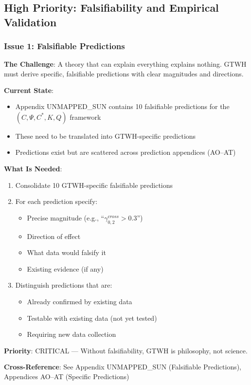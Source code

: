 \subsection{High Priority: Falsifiability and Empirical Validation}

\subsubsection{Issue 1: Falsifiable Predictions}

\begin{tcolorbox}[colback=red!5!white, colframe=red!75!black, title=Status: Partially Addressed]
\textbf{The Challenge}: A theory that can explain everything explains nothing. 
GTWH must derive specific, falsifiable predictions with clear magnitudes and 
directions.

\textbf{Current State}: 
\begin{itemize}[nosep]
\item Appendix UNMAPPED_SUN contains 10 falsifiable predictions for the $(C, \Psi, C^*, K, Q)$ framework
\item These need to be translated into GTWH-specific predictions
\item Predictions exist but are scattered across prediction appendices (AO--AT)
\end{itemize}

\textbf{What Is Needed}:
\begin{enumerate}
\item Consolidate 10 GTWH-specific falsifiable predictions
\item For each prediction specify:
    \begin{itemize}[nosep]
    \item Precise magnitude (e.g., ``$\gamma^{cross}_{0,2} > 0.3$'')
    \item Direction of effect
    \item What data would falsify it
    \item Existing evidence (if any)
    \end{itemize}
\item Distinguish predictions that are:
    \begin{itemize}[nosep]
    \item Already confirmed by existing data
    \item Testable with existing data (not yet tested)
    \item Requiring new data collection
    \end{itemize}
\end{enumerate}

\textbf{Priority}: \colorbox{red!20}{CRITICAL} --- Without falsifiability, GTWH is philosophy, not science.

\textbf{Cross-Reference}: See Appendix UNMAPPED_SUN (Falsifiable Predictions), Appendices AO--AT (Specific Predictions)
\end{tcolorbox}

